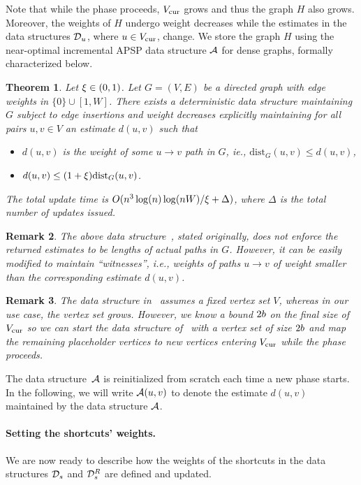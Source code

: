 \documentclass[11pt,letterpaper]{article}
\theoremstyle{plain}
\newtheorem{theorem}{Theorem}[section]
\newtheorem{remark}[theorem]{Remark}
\renewcommand{\O}{O}
\newcommand{\dist}{\mathrm{dist}}
\begin{document}
Note that while the phase proceeds, $V_{\mathrm{cur}}$ grows and thus the graph $H$ also grows.
Moreover, the weights of $H$ undergo weight decreases while the estimates
in the data structures $\mathcal{D}_u$, where $u\in V_{\mathrm{cur}}$, change.
We store the graph $H$ using the near-optimal incremental APSP data structure $\mathcal{A}$ for dense graphs, formally characterized below.

\begin{theorem}\label{t:dense-apsp}{}
  Let $\xi\in (0,1)$. Let $G=(V,E)$ be a directed graph with edge weights in $\{0\}\cup [1,W]$.
There exists a deterministic data structure maintaining $G$ subject to edge insertions
and weight decreases explicitly maintaining for all pairs $u,v\in V$ an estimate $d(u,v)$ such that
\begin{itemize}
  \item $d(u,v)$ is the weight of some $u\to v$ path in $G$, ie., $\dist_G(u,v)\leq d(u,v)$,
  \item $d(u,v) \leq (1+\epsp)\dist_G(u,v)$.
\end{itemize}
The total update time is $\O(n^3\log(n)\log(nW)/\epsp+\Delta)$,
where $\Delta$ is the total number of updates issued.
\end{theorem}
\begin{remark}
The above data structure~{}, stated originally, does not enforce the returned estimates to be lengths of actual paths in $G$.
However, it can be easily modified to maintain ``witnesses'', i.e., weights of paths $u\to v$ of weight smaller than the corresponding estimate $d(u,v)$.
\end{remark}
\begin{remark}
The data structure in~ assumes a fixed vertex set $V$, whereas in our use case, the vertex set grows. However, we know a bound $2b$ on the final size of $V_{\mathrm{cur}}$ so we can start the data structure of~ with a vertex set of size $2b$ and map the remaining placeholder vertices to new vertices entering $V_{\mathrm{cur}}$ while the phase proceeds.
\end{remark}
The data structure~$\mathcal{A}$ is reinitialized from scratch each time a new phase starts.
In the following, we will write $\mathcal{A}(u,v)$ to denote the estimate $d(u,v)$ maintained by the data structure $\mathcal{A}$.

\paragraph{Setting the shortcuts' weights.}
We are now ready to describe how the weights of the shortcuts in the data structures $\mathcal{D}_s$ and
$\mathcal{D}^{R}_s$ are defined and updated.
\end{document}
